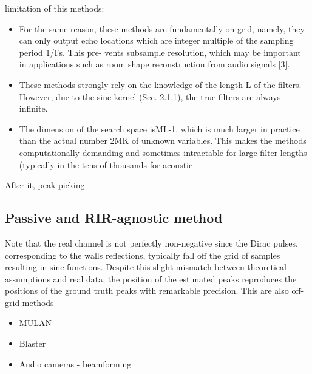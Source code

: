 limitation of this methods:

\begin{itemize}
    \item For the same reason, these methods are fundamentally on-grid, namely, they can only output echo locations which are integer multiple of the sampling period 1/Fs. This pre- vents subsample resolution, which may be important in applications such as room shape reconstruction from audio signals [3].
    \item These methods strongly rely on the knowledge of the length L of the filters. However, due to the sinc kernel (Sec. 2.1.1), the true filters are always infinite.
    \item The dimension of the search space isML-1, which is much larger in practice than the actual number 2MK of unknown variables. This makes the methods computationally demanding and sometimes intractable for large filter lengths (typically in the tens of thousands for acoustic
\end{itemize}

After it, peak picking

\subsection{Passive and RIR-agnostic method}
Note that the real channel is not perfectly non-negative since the Dirac pulses, corresponding to the walls reflections, typically fall off the grid of samples resulting in sinc functions. Despite this slight mismatch between theoretical assumptions and real data, the position of the estimated peaks reproduces the positions of the ground truth peaks with remarkable precision.
This are also off-grid methods
\begin{itemize}
    \item MULAN 
    \item Blaster 
    \item Audio cameras - beamforming~
\end{itemize}

